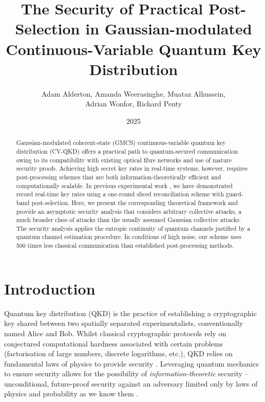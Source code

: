 ﻿\documentclass[12pt]{article}
\begin{document}
\title{The Security of Practical Post-Selection in Gaussian-modulated Continuous-Variable Quantum Key Distribution}
\author{Adam Alderton, Amanda Weerasinghe, Muataz Alhussein, \\ Adrian Wonfor, Richard Penty}
\date{2025}

\maketitle


\begin{abstract}

Gaussian-modulated coherent-state (GMCS) continuous-variable quantum key distribution (CV-QKD) offers a practical path to quantum-secured communication owing to its compatibility with existing optical fibre networks and use of mature security proofs. Achieving high secret key rates in real-time systems, however, requires post-processing schemes that are both information-theoretically efficient and computationally scalable. In previous experimental work \cite{Weerasinghe-2023}, we have demonstrated record real-time key rates using a one-round sliced reconciliation scheme with guard-band post-selection. Here, we present the corresponding theoretical framework and provide an asymptotic security analysis that considers arbitrary collective attacks, a much broader class of attacks than the usually assumed Gaussian collective attacks. The security analysis applies the entropic continuity of quantum channels justified by a quantum channel estimation procedure. In conditions of high noise, our scheme uses 500 times less classical communication than established post-processing methods.
\end{abstract}


\onehalfspacing


\section{Introduction}\label{sec:introduction}

Quantum key distribution (QKD) is the practice of establishing a cryptographic key shared between two spatially separated experimentalists, conventionally named Alice and Bob. Whilst classical cryptographic protocols rely on conjectured computational hardness associated with certain problems (factorisation of large numbers, discrete logarithms, etc.), QKD relies on fundamental laws of physics to provide security \cite{Scarani-2009, Nielsen-2010}. Leveraging quantum mechanics to ensure security allows for the possibility of \textit{information-theoretic} security -- unconditional, future-proof security against an adversary limited only by laws of physics and probability as we know them \cite{Renner-2023}.
\end{document}
